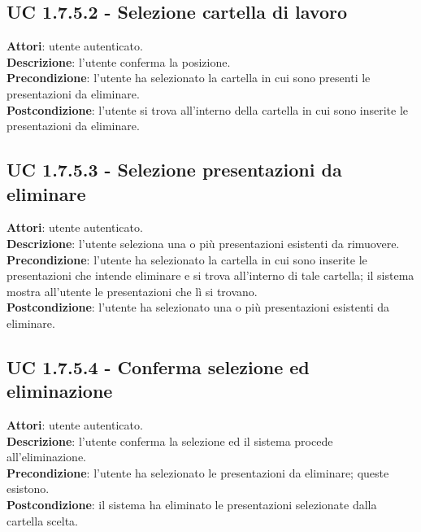 		\subsection{UC 1.7.5.2 - Selezione cartella di lavoro}{
			\label{uc1.7.5.2}
			\textbf{Attori}: utente autenticato. \\
			\textbf{Descrizione}: l'utente conferma la posizione. \\
			\textbf{Precondizione}: l'utente ha selezionato la cartella in cui sono presenti le presentazioni da eliminare.	\\
			\textbf{Postcondizione}: l'utente si trova all'interno della cartella in cui sono inserite le presentazioni da eliminare. 	\\
			}
		\subsection{UC 1.7.5.3 - Selezione presentazioni da eliminare}{
			\label{uc1.7.5.3}
			\textbf{Attori}: utente autenticato. \\
			\textbf{Descrizione}: l'utente seleziona una o più presentazioni esistenti da rimuovere. \\
			\textbf{Precondizione}: l'utente ha selezionato la cartella in cui sono  inserite le presentazioni che intende eliminare e si trova all'interno di tale cartella; il sistema mostra all'utente le presentazioni che lì si trovano.	\\
			\textbf{Postcondizione}: l'utente ha selezionato una o più presentazioni esistenti da eliminare.	\\
			}
		\subsection{UC 1.7.5.4 - Conferma selezione ed eliminazione}{
			\label{uc1.7.5.4}
			\textbf{Attori}: utente autenticato. \\
			\textbf{Descrizione}: l'utente conferma la selezione ed il sistema procede all'eliminazione. \\
			\textbf{Precondizione}: l'utente ha selezionato le presentazioni da eliminare; queste esistono.	\\
			\textbf{Postcondizione}: il sistema ha eliminato le presentazioni selezionate dalla cartella scelta.	\\
			}
